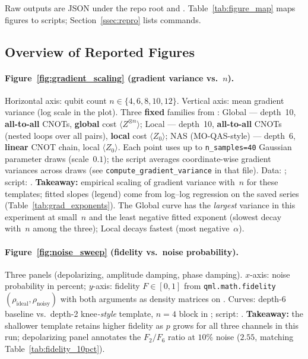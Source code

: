 \noindent
Raw outputs are JSON under the repo root and .
Table~\ref{tab:figure_map} maps figures to scripts; Section~\ref{ssec:repro}
lists commands.

\subsection{Overview of Reported Figures}\label{ssec:figure_overview}

\paragraph{Figure~\ref{fig:gradient_scaling} (gradient variance vs.\ $n$).}
Horizontal axis: qubit count $n\in\{4,6,8,10,12\}$.
Vertical axis: mean gradient variance (log scale in the plot).
Three \textbf{fixed} families from :
\textsf{Global} --- depth~10, \textbf{all-to-all} CNOTs, \textbf{global} cost
$\langle Z^{\otimes n}\rangle$;
\textsf{Local} --- depth~10, \textbf{all-to-all} CNOTs (nested loops over all
pairs), \textbf{local} cost $\langle Z_0\rangle$;
\textsf{NAS} (MO-QAS-style) --- depth~6, \textbf{linear} CNOT chain, local
$\langle Z_0\rangle$.
Each point uses up to \texttt{n\_samples=40} Gaussian parameter draws
(scale~$0.1$); the script averages coordinate-wise gradient variances across
draws (see \texttt{compute\_gradient\_variance} in that file).
Data: ; script:
.
\textbf{Takeaway:} empirical scaling of gradient variance with~$n$ for these
templates; fitted slopes (legend) come from log--log regression on the saved
series (Table~\ref{tab:grad_exponents}). The \textsf{Global} curve has the
\emph{largest} variance in this experiment at small~$n$ and the least negative
fitted exponent (slowest decay with~$n$ among the three); \textsf{Local} decays
fastest (most negative~$\alpha$).

\paragraph{Figure~\ref{fig:noise_sweep} (fidelity vs.\ noise probability).}
Three panels (depolarizing, amplitude damping, phase damping).
$x$-axis: noise probability in percent; $y$-axis: fidelity
$F\in[0,1]$ from \texttt{qml.math.fidelity}$(\rho_{\mathrm{ideal}},\rho_{\mathrm{noisy}})$
with both arguments as density matrices on .
Curves: depth-6 baseline vs.\ depth-2 knee\emph{-style} template, $n=4$ block
in ; script:
.
\textbf{Takeaway:} the shallower template retains higher fidelity as $p$ grows for
all three channels in this run; depolarizing panel annotates the $F_2/F_6$ ratio
at $10\%$ noise ($2.55$, matching Table~\ref{tab:fidelity_10pct}).

